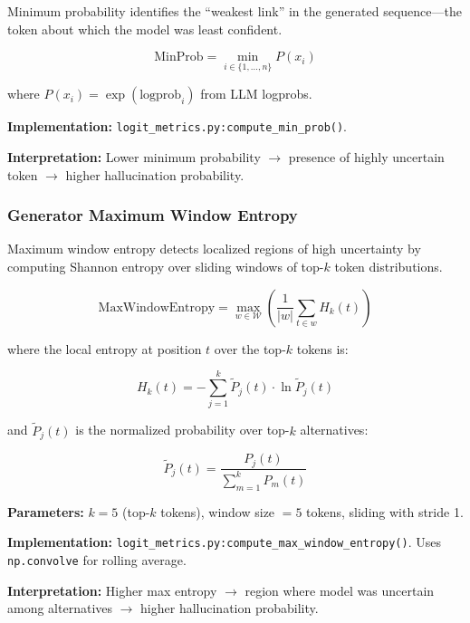 Minimum probability identifies the ``weakest link'' in the generated sequence---the token about which the model was least confident.

\begin{equation}
\text{MinProb} = \min_{i \in \{1,\ldots,n\}} P(x_i)
\label{eq:minprob}
\end{equation}

where $P(x_i) = \exp(\text{logprob}_i)$ from LLM logprobs.

\textbf{Implementation:} \texttt{logit\_metrics.py:compute\_min\_prob()}.

\textbf{Interpretation:} Lower minimum probability $\rightarrow$ presence of highly uncertain token $\rightarrow$ higher hallucination probability.

\subsubsection{Generator Maximum Window Entropy}

Maximum window entropy detects localized regions of high uncertainty by computing Shannon entropy over sliding windows of top-$k$ token distributions.

\begin{equation}
\text{MaxWindowEntropy} = \max_{w \in \mathcal{W}} \left( \frac{1}{|w|} \sum_{t \in w} H_k(t) \right)
\label{eq:maxent}
\end{equation}

where the local entropy at position $t$ over the top-$k$ tokens is:

\begin{equation}
H_k(t) = -\sum_{j=1}^{k} \tilde{P}_j(t) \cdot \ln \tilde{P}_j(t)
\label{eq:local_entropy}
\end{equation}

and $\tilde{P}_j(t)$ is the normalized probability over top-$k$ alternatives:

\begin{equation}
\tilde{P}_j(t) = \frac{P_j(t)}{\sum_{m=1}^{k} P_m(t)}
\label{eq:normalized_prob}
\end{equation}

\textbf{Parameters:} $k = 5$ (top-$k$ tokens), window size $= 5$ tokens, sliding with stride 1.

\textbf{Implementation:} \texttt{logit\_metrics.py:compute\_max\_window\_entropy()}. Uses \texttt{np.convolve} for rolling average.

\textbf{Interpretation:} Higher max entropy $\rightarrow$ region where model was uncertain among alternatives $\rightarrow$ higher hallucination probability.

